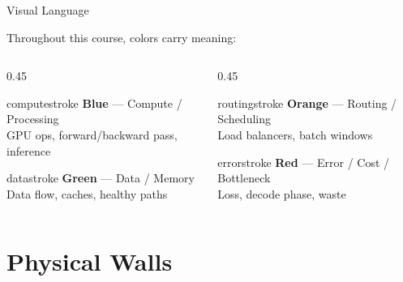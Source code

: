\documentclass[aspectratio=169, 12pt]{beamer}
\begin{document}
\begin{frame}{Visual Language}
\note{
%
}

\small
Throughout this course, colors carry meaning:

\vspace{0.3cm}
\begin{columns}[T]
  \begin{column}{0.45\textwidth}
    \begin{mlsyscard}{computestroke}
    \textbf{Blue} --- Compute / Processing\\
    {\footnotesize GPU ops, forward/backward pass, inference}
    \end{mlsyscard}
    \vspace{0.15cm}
    \begin{mlsyscard}{datastroke}
    \textbf{Green} --- Data / Memory\\
    {\footnotesize Data flow, caches, healthy paths}
    \end{mlsyscard}
  \end{column}
  \begin{column}{0.45\textwidth}
    \begin{mlsyscard}{routingstroke}
    \textbf{Orange} --- Routing / Scheduling\\
    {\footnotesize Load balancers, batch windows}
    \end{mlsyscard}
    \vspace{0.15cm}
    \begin{mlsyscard}{errorstroke}
    \textbf{Red} --- Error / Cost / Bottleneck\\
    {\footnotesize Loss, decode phase, waste}
    \end{mlsyscard}
  \end{column}
\end{columns}
\end{frame}


\section{Physical Walls}
\end{document}
